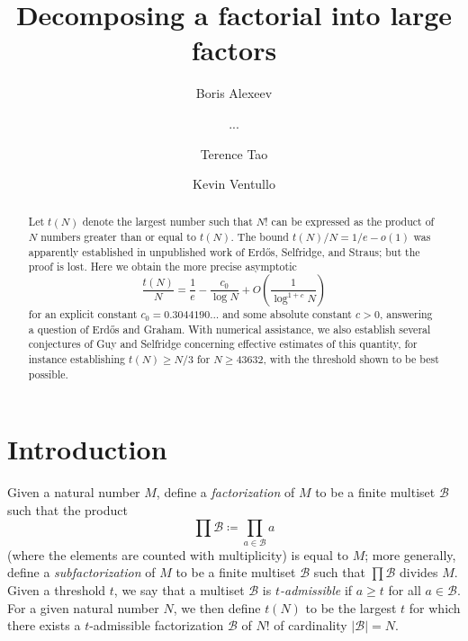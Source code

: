 \documentclass[12pt,a4paper,reqno]{amsart}
\numberwithin{equation}{section}
\theoremstyle{plain}
\theoremstyle{definition}
\newcommand\tuple{{\mathcal B}}
\begin{document}
\title{Decomposing a factorial into large factors}

\author{Boris Alexeev}
\address{???}


\author{...}
\address{???}

\author{Terence Tao}
\address{UCLA Department of Mathematics, Los Angeles, CA 90095-1555.}

\author{Kevin Ventullo}
\address{???}



\begin{abstract}  Let $t(N)$ denote the largest number such that $N!$ can be expressed as the product of $N$ numbers greater than or equal to $t(N)$.
The bound $t(N)/N = 1/e-o(1)$ was apparently established in unpublished work of Erd\H{o}s, Selfridge, and Straus; but the proof is lost.  Here we obtain the more precise asymptotic 
$$ \frac{t(N)}{N} = \frac{1}{e} - \frac{c_0}{\log N} + O\left( \frac{1}{\log^{1+c} N} \right)$$
for an explicit constant $c_0 = 0.3044190\dots$ and some absolute constant $c>0$, answering a question of Erd\H{o}s and Graham.  With numerical assistance, we also establish several conjectures of Guy and Selfridge concerning effective estimates of this quantity, for instance establishing $t(N) \geq N/3$ for $N \geq 43632$, with the threshold shown to be best possible.\end{abstract}


\maketitle


\section{Introduction}

Given a natural number $M$, define a \emph{factorization} of $M$ to be a finite multiset $\tuple$ such that the product
$$ \prod \tuple \coloneqq \prod_{a \in \tuple} a$$
(where the elements are counted with multiplicity) is equal to $M$; more generally, define a \emph{subfactorization} of $M$ to be a finite multiset $\tuple$ such that $\prod \tuple$ divides $M$.  Given a threshold $t$, we say that a multiset $\tuple$ is \emph{$t$-admissible} if $a \geq t$ for all $a \in \tuple$.  For a given natural number $N$, we then define $t(N)$ to be the largest $t$ for which there exists a $t$-admissible factorization $\tuple$ of $N!$ of cardinality $|\tuple|=N$.  
\end{document}
